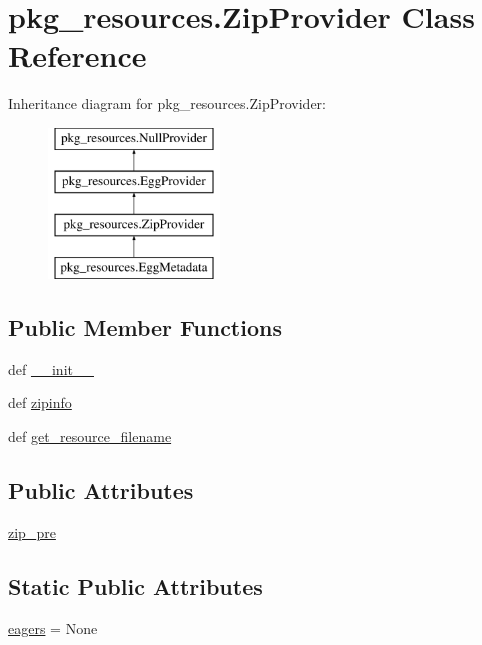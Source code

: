 \hypertarget{classpkg__resources_1_1ZipProvider}{}\section{pkg\+\_\+resources.\+Zip\+Provider Class Reference}
\label{classpkg__resources_1_1ZipProvider}
Inheritance diagram for pkg\+\_\+resources.\+Zip\+Provider\+:\begin{figure}[H]
\begin{center}
\leavevmode
\includegraphics[height=4.000000cm]{classpkg__resources_1_1ZipProvider}
\end{center}
\end{figure}
\subsection*{Public Member Functions}
\begin{DoxyCompactItemize}
\item 
def \hyperlink{classpkg__resources_1_1ZipProvider_a97bff8d77fdf8451c002170fcec80dc2}{\+\_\+\+\_\+init\+\_\+\+\_\+}
\item 
def \hyperlink{classpkg__resources_1_1ZipProvider_a07624579c455791aa48e8a53bf4efabf}{zipinfo}
\item 
def \hyperlink{classpkg__resources_1_1ZipProvider_ae6533b8912cada287c559ece88f89147}{get\+\_\+resource\+\_\+filename}
\end{DoxyCompactItemize}
\subsection*{Public Attributes}
\begin{DoxyCompactItemize}
\item 
\hyperlink{classpkg__resources_1_1ZipProvider_a8c7e07e72f08f590b78a57b55f4b04e8}{zip\+\_\+pre}
\end{DoxyCompactItemize}
\subsection*{Static Public Attributes}
\begin{DoxyCompactItemize}
\item 
\hyperlink{classpkg__resources_1_1ZipProvider_a0887e6dee1cc39873e6c4666423c4b17}{eagers} = None
\end{DoxyCompactItemize}


